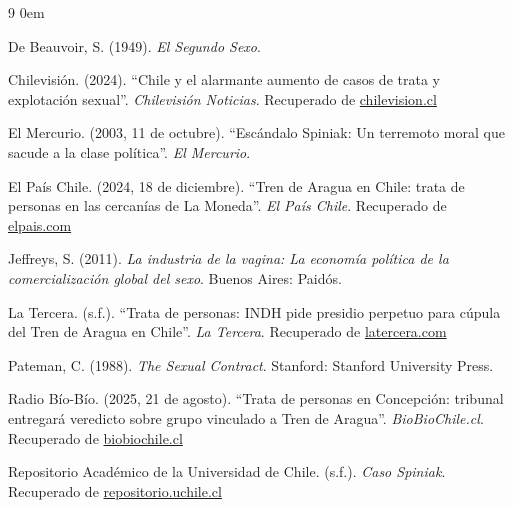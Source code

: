 \documentclass[12pt, a4paper]{article}
\begin{document}
\begin{thebibliography}{9}
	\itemsep0em

	 De Beauvoir, S. (1949). \textit{El Segundo Sexo}.

	 Chilevisión. (2024). ``Chile y el alarmante aumento de casos de trata y explotación sexual''. \textit{Chilevisión Noticias}. Recuperado de \href{https://www.chilevision.cl/noticias/reportajes/a-fondo/chile-y-el-alarmante-aumento-de-casos-de-trata-y-explotacion-sexual}{chilevision.cl}

	 El Mercurio. (2003, 11 de octubre). ``Escándalo Spiniak: Un terremoto moral que sacude a la clase política''. \textit{El Mercurio}.

	 El País Chile. (2024, 18 de diciembre). ``Tren de Aragua en Chile: trata de personas en las cercanías de La Moneda''. \textit{El País Chile}. Recuperado de \href{https://elpais.com/chile/2024-12-18/tren-de-aragua-en-chile-trata-de-personas-en-las-cercanias-de-la-moneda.html}{elpais.com}

	 Jeffreys, S. (2011). \textit{La industria de la vagina: La economía política de la comercialización global del sexo}. Buenos Aires: Paidós.

	 La Tercera. (s.f.). ``Trata de personas: INDH pide presidio perpetuo para cúpula del Tren de Aragua en Chile''. \textit{La Tercera}. Recuperado de \href{https://www.latercera.com/nacional/noticia/trata-de-personas-indh-pide-presidio-perpetuo-para-cupula-del-tren-de-aragua-en-chile/}{latercera.com}

	 Pateman, C. (1988). \textit{The Sexual Contract}. Stanford: Stanford University Press.

	 Radio Bío-Bío. (2025, 21 de agosto). ``Trata de personas en Concepción: tribunal entregará veredicto sobre grupo vinculado a Tren de Aragua''. \textit{BioBioChile.cl}. Recuperado de \href{https://www.biobiochile.cl/noticias/nacional/region-del-bio-bio/2025/08/21/trata-de-personas-en-concepcion-tribunal-entregara-veredicto-sobre-grupo-vinculado-a-tren-de-aragua.shtml}{biobiochile.cl}

	 Repositorio Académico de la Universidad de Chile. (s.f.). \textit{Caso Spiniak}. Recuperado de \href{https://repositorio.uchile.cl/handle/2250/135555}{repositorio.uchile.cl}

\end{thebibliography}
\end{document}
